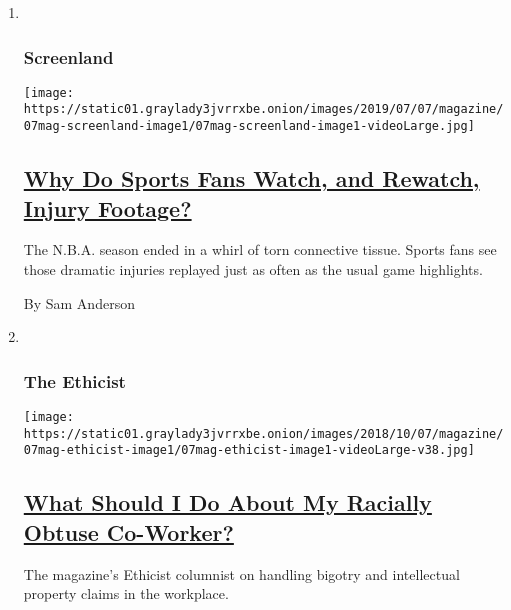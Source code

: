 \begin{enumerate}
\def\labelenumi{\arabic{enumi}.}
\item ~
  \hypertarget{screenland}{%
  \subsubsection{Screenland}\label{screenland}}

  \texttt{[image: https://static01.graylady3jvrrxbe.onion/images/2019/07/07/magazine/07mag-screenland-image1/07mag-screenland-image1-videoLarge.jpg]}

  \hypertarget{why-do-sports-fans-watch-and-rewatch-injury-footage}{%
  \subsection{\texorpdfstring{\href{/2019/07/03/magazine/why-do-sports-fans-watch-and-rewatch-injury-footage.html}{Why
  Do Sports Fans Watch, and Rewatch, Injury
  Footage?}}{Why Do Sports Fans Watch, and Rewatch, Injury Footage?}}\label{why-do-sports-fans-watch-and-rewatch-injury-footage}}

  The N.B.A. season ended in a whirl of torn connective tissue. Sports
  fans see those dramatic injuries replayed just as often as the usual
  game highlights.

  By Sam Anderson
\item ~
  \hypertarget{the-ethicist}{%
  \subsubsection{The Ethicist}\label{the-ethicist}}

  \texttt{[image: https://static01.graylady3jvrrxbe.onion/images/2018/10/07/magazine/07mag-ethicist-image1/07mag-ethicist-image1-videoLarge-v38.jpg]}

  \hypertarget{what-should-i-do-about-my-racially-obtuse-co-worker}{%
  \subsection{\texorpdfstring{\href{/2019/07/02/magazine/what-should-i-do-about-my-racially-obtuse-co-worker.html}{What
  Should I Do About My Racially Obtuse
  Co-Worker?}}{What Should I Do About My Racially Obtuse Co-Worker?}}\label{what-should-i-do-about-my-racially-obtuse-co-worker}}

  The magazine's Ethicist columnist on handling bigotry and intellectual
  property claims in the workplace.


\end{enumerate}
